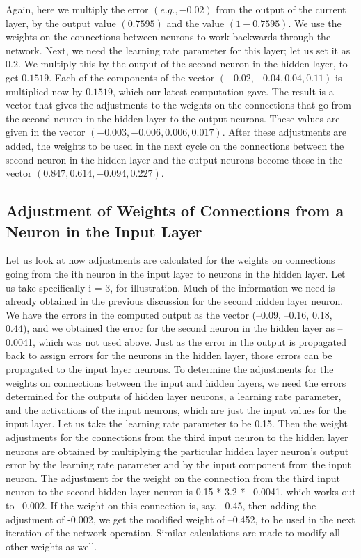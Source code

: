 Again, here we multiply the error $(e.g., -0.02)$ from the output of the current layer, by the output value $(0.7595)$ and the value $(1-0.7595)$. We use the weights on the connections between neurons to work backwards through the network. Next, we need the learning rate parameter for this layer; let us set it as $0.2$. We multiply this by the output of the second neuron in the hidden layer, to get $0.1519$. Each of the components of the vector $(-0.02, -0.04, 0.04, 0.11)$ is multiplied now by $0.1519$, which our latest computation gave. The result is a vector that gives the adjustments to the weights on the connections that go from the second neuron in the hidden layer to the output neurons. These values are given in the vector $(-0.003, -0.006, 0.006,0.017)$. After these adjustments are added, the weights to be used in the next cycle on the connections between the second neuron in the hidden layer and the output neurons become those in the vector
$(0.847, 0.614, -0.094, 0.227)$.

\subsection{Adjustment of Weights of Connections from a Neuron in
the Input Layer}

Let us look at how adjustments are calculated for the weights on connections going from the ith neuron in the input layer to neurons in the hidden layer. Let us take specifically i = 3, for illustration. Much of the information we need is already obtained in the previous discussion for the second hidden layer neuron. We have the errors in the computed output as the vector (–0.09, –0.16, 0.18, 0.44), and we obtained the error for the second neuron in the hidden layer as –0.0041, which was not used above. Just as the error in the output is propagated back to assign errors for the neurons in the hidden layer, those errors can be propagated to the input layer neurons.
To determine the adjustments for the weights on connections between the input and hidden layers, we need the errors determined for the outputs of hidden layer neurons, a learning rate parameter, and the activations of the input neurons, which are just the input values for the input layer. Let us take the learning rate parameter to be 0.15. Then the weight adjustments for the connections from the third input neuron to the hidden layer neurons are obtained by multiplying the particular hidden layer neuron’s output error by the learning rate parameter and by the input component from the input neuron. The adjustment for the weight on the connection from the third input neuron to the second hidden layer neuron is 0.15 * 3.2 * –0.0041, which works out to –0.002. If the weight on this connection is, say, –0.45, then adding the adjustment of -0.002, we get the modified
weight of –0.452, to be used in the next iteration of the network operation. Similar calculations are made to modify all other weights as well.

